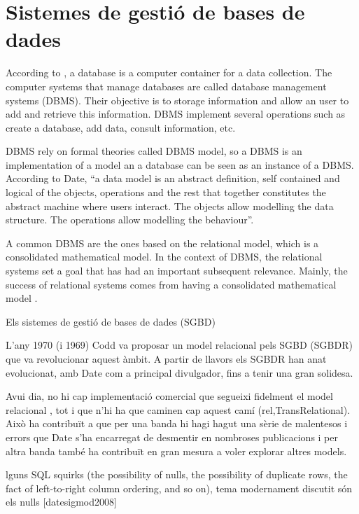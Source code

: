 \section[SGBD]{Sistemes de gestió de bases de dades}
\label{sec:art:sgbd}



According to \textcite{date}, a database is a computer container for a data collection. The computer systems that manage databases are called database management systems (DBMS). Their objective is to storage information and allow an user to add and retrieve this information. DBMS implement several operations such as create a database, add data, consult information, etc.

DBMS rely on formal theories called DBMS model, so a DBMS is an implementation of a model an a database can be seen as an instance of a DBMS. According to Date, ``a data model is an abstract definition, self contained and logical of the objects, operations and the rest that together constitutes the abstract machine where users interact. The objects allow modelling the data structure. The operations allow modelling the behaviour''.

A common DBMS are the ones based on the relational model, which is a consolidated mathematical model. In the context of DBMS, the relational systems set a goal that has had an important subsequent relevance. Mainly, the success of relational systems comes from having a consolidated mathematical model \parencite{date}.


Els sistemes de gestió de bases de dades (SGBD) 



L'any 1970 (i 1969) Codd va proposar un model relacional pels SGBD (SGBDR) que va revolucionar aquest àmbit. A partir de llavors els SGBDR han anat evolucionat, amb Date com a principal divulgador, fins a tenir una gran solidesa.

Avui dia, no hi cap implementació comercial que segueixi fidelment el model relacional , tot i que n'hi ha que caminen cap aquest camí (rel,TransRelational). Això ha contribuït a que per una banda hi hagi hagut una sèrie de malentesos i errors que Date s'ha encarregat de desmentir en nombroses publicacions  i per altra banda també ha contribuït en gran mesura a voler explorar altres models.              


lguns SQL squirks (the possibility of nulls, the possibility of duplicate rows, the
fact of left-to-right column ordering, and so on), tema modernament discutit són els nulls [datesigmod2008]

